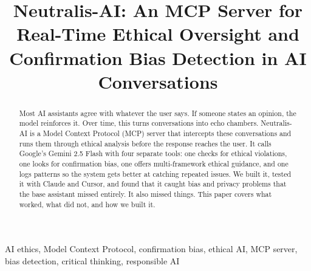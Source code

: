\documentclass[conference]{IEEEtran}
\begin{document}
\title{Neutralis-AI: An MCP Server for Real-Time Ethical Oversight and Confirmation Bias Detection in AI Conversations}

\author{
\and
{}
\and
{}
}

\maketitle

\begin{abstract}
Most AI assistants agree with whatever the user says. If someone states an opinion, the model reinforces it. Over time, this turns conversations into echo chambers. Neutralis-AI is a Model Context Protocol (MCP) server that intercepts these conversations and runs them through ethical analysis before the response reaches the user. It calls Google's Gemini 2.5 Flash with four separate tools: one checks for ethical violations, one looks for confirmation bias, one offers multi-framework ethical guidance, and one logs patterns so the system gets better at catching repeated issues. We built it, tested it with Claude and Cursor, and found that it caught bias and privacy problems that the base assistant missed entirely. It also missed things. This paper covers what worked, what did not, and how we built it.
\end{abstract}

\begin{IEEEkeywords}
AI ethics, Model Context Protocol, confirmation bias, ethical AI, MCP server, bias detection, critical thinking, responsible AI
\end{IEEEkeywords}
\end{document}
